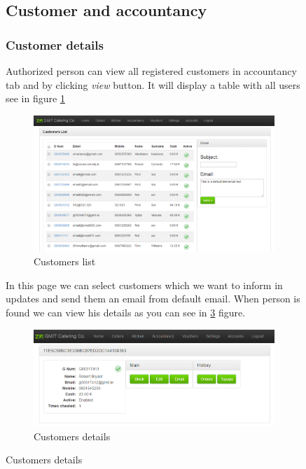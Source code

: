 \begin{figure}
	\subsection{Customer and accountancy}
		\subsubsection{Customer details}
		
		Authorized person can view all registered customers in accountancy tab and by clicking \textit{view} button. It will display a table with all users see in figure \ref{fig:customer-list}
		
		\begin{figure}[H]
			\centering
			\includegraphics[width=1\textwidth]{img/zf2/04-customers.png}
			\caption{Customers list}
			\label{fig:customer-list}
		\end{figure}
		
		In this page we can select customers which we want to inform in updates and send them an email from default email. 
		When person is found we can view his details as you can see in \ref{fig:customer-details} figure.
		
		\begin{figure}[H]
			\centering
			\includegraphics[width=1\textwidth]{img/zf2/02-customer_information.png}
			\caption{Customers details}
			\label{fig:customer-details}
		\end{figure}
		

\end{figure}
